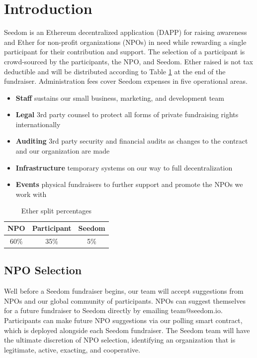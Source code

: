 \documentclass[11pt]{article}
\begin{document}
\tableofcontents
\pagebreak

\section{Introduction}

Seedom is an Ethereum decentralized application (DAPP) for raising awareness and Ether for non-profit organizations (NPOs) in need while rewarding a single participant for their contribution and support. The selection of a participant is crowd-sourced by the participants, the NPO, and Seedom. Ether raised is not tax deductible and will be distributed according to Table \ref{tab:etherSplitPercentages} at the end of the fundraiser. Administration fees cover Seedom expenses in five operational areas.

\begin{itemize}
\item{\textbf{Staff} sustains our small business, marketing, and development team}
\item{\textbf{Legal} 3rd party counsel to protect all forms of private fundraising rights internationally}
\item{\textbf{Auditing} 3rd party security and financial audits as changes to the contract and our organization are made}
\item{\textbf{Infrastructure} temporary systems on our way to full decentralization}
\item{\textbf{Events} physical fundraisers to further support and promote the NPOs we work with}
\end{itemize}

\begin{table}[H]
\begin{center}
\begin{tabular}{| c | c | c |}
\hline
\textbf{NPO} & \textbf{Participant} & \textbf{Seedom} \\ \hline
60\% & 35\%  & 5\% \\ \hline
\end{tabular}
\caption{Ether split percentages}
\label{tab:etherSplitPercentages}
\end{center}
\end{table}

\subsection{NPO Selection}

Well before a Seedom fundraiser begins, our team will accept suggestions from NPOs and our global community of participants. NPOs can suggest themselves for a future fundraiser to Seedom directly by emailing team@seedom.io. Participants can make future NPO suggestions via our polling smart contract, which is deployed alongside each Seedom fundraiser. The Seedom team will have the ultimate discretion of NPO selection, identifying an organization that is legitimate, active, exacting, and cooperative.
\end{document}
